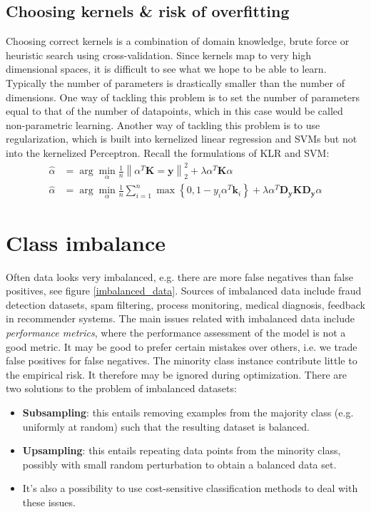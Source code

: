 \documentclass[a4paper,10pt,twoside]{article}
\newcommand\norm[1]{\left\lVert#1\right\rVert}
\begin{document}
\subsection{Choosing kernels \& risk of overfitting}

Choosing correct kernels is a combination of domain knowledge, brute force or heuristic search using cross-validation. Since kernels map to very high dimensional spaces, it is difficult to see what we hope to be able to learn. Typically the number of parameters is drastically smaller than the number of dimensions. One way of tackling this problem is to set the number of parameters equal to that of the number of datapoints, which in this case would be called non-parametric learning. Another way of tackling this problem is to use regularization, which is built into kernelized linear regression and SVMs but not into the kernelized Perceptron. Recall the formulations of KLR and SVM:
\begin{align*}
    \hat{\alpha} &= \arg\min_{\alpha}\frac{1}{n}\norm{\alpha^T\mathbf{K}=\mathbf{y}}_2^2+\lambda\alpha^T\mathbf{K}\alpha\\
    \hat{\alpha} &= \arg\min_{\alpha}\frac{1}{n}\sum_{i=1}^{n}\max\left\{0,1-y_i\alpha^T\mathbf{k}_i\right\} + \lambda\alpha^T\mathbf{D}_{\mathbf{y}}\mathbf{K}\mathbf{D}_\mathbf{y}\alpha
\end{align*}

\section{Class imbalance}

Often data looks very imbalanced, e.g. there are more false negatives than false positives, see figure \ref{imbalanced_data}. Sources of imbalanced data include fraud detection datasets, spam filtering, process monitoring, medical diagnosis, feedback in recommender systems. The main issues related with imbalanced data include \textit{performance metrics}, where the performance assessment of the model is not a good metric. It may be good to prefer certain mistakes over others, i.e. we trade false positives for false negatives. The minority class instance contribute little to the empirical risk. It therefore may be ignored during optimization. There are two solutions to the problem of imbalanced datasets:
\begin{itemize}
    \item \textbf{Subsampling}: this entails removing examples from the majority class (e.g. uniformly at random) such that the resulting dataset is balanced.
    \item \textbf{Upsampling}: this entails repeating data points from the minority class, possibly with small random perturbation to obtain a balanced data set.
    \item It's also a possibility to use cost-sensitive classification methods to deal with these issues.
\end{itemize}
\end{document}
